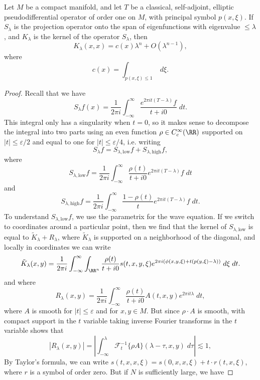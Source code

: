 \begin{theorem}
    Let $M$ be a compact manifold, and let $T$ be a classical, self-adjoint, elliptic pseudodifferential operator of order one on $M$, with principal symbol $p(x,\xi)$. If $S_\lambda$ is the projection operator onto the span of eigenfunctions with eigenvalue $\leq \lambda$, and $K_\lambda$ is the kernel of the operator $S_\lambda$, then
    \[ K_\lambda(x,x) = c(x) \lambda^n + O(\lambda^{n-1}), \]
    where
    \[  c(x) = \int_{p(x,\xi) \leq 1}\; d\xi. \]
\end{theorem}
\begin{proof}
    Recall that we have
    \[ S_\lambda f(x) = \frac{1}{2 \pi i} \int_{-\infty}^\infty \frac{e^{2 \pi i t (T - \lambda)} f}{t + i 0}\; dt. \]
    This integral only has a singularity when $t = 0$, so it makes sense to decompose the integral into two parts using an even function $\rho \in C_c^\infty(\RR)$ supported on $|t| \leq \varepsilon / 2$ and equal to one for $|t| \leq \varepsilon / 4$, i.e. writing
    \[ S_\lambda f = S_{\lambda, \text{low}} f + S_{\lambda,\text{high}} f, \]
    where
    \[ S_{\lambda, \text{low}} f = \frac{1}{2 \pi i} \int_{-\infty}^\infty \frac{\rho(t)}{t + i0} e^{2 \pi i t (T - \lambda)} f\; dt \]
    and
    \[ S_{\lambda,\text{high}} f = \frac{1}{2 \pi i} \int_{-\infty}^\infty \frac{1 - \rho(t)}{t} e^{2 \pi i t (T - \lambda)} f\; dt. \]
    To understand $S_{\lambda, \text{low}} f$, we use the parametrix for the wave equation. If we switch to coordinates around a particular point, then we find that the kernel of $S_{\lambda, \text{low}}$ is equal to $\tilde{K}_\lambda + R_\lambda$, where $\tilde{K}_\lambda$ is supported on a neighborhood of the diagonal, and locally in coordinates we can write
    \[ \tilde{K}_\lambda(x,y) = \frac{1}{2 \pi i} \int_{-\infty}^\infty \int_{\RR^n} \frac{\rho(t)}{t + i0} s(t,x,y,\xi) e^{2 \pi i (\phi(x,y,\xi) + t(p(y,\xi) - \lambda))}\; d\xi\; dt. \]
    and where
    \[ R_\lambda(x,y) = \frac{1}{2 \pi i} \int_{-\infty}^\infty \frac{\rho(t)}{t + i 0} A(t,x,y) e^{2 \pi i t \lambda}\; dt, \]
    where $A$ is smooth for $|t| \leq \varepsilon$ and for $x,y \in M$. But since $\rho \cdot A$ is smooth, with compact support in the $t$ variable taking inverse Fourier transforms in the $t$ variable shows that
    \[ |R_\lambda(x,y)| = \left| \int_{-\infty}^\lambda \mathcal{F}_t^{-1}\{\rho A\}(\lambda - \tau,x,y)\; d\tau \right| \lesssim 1, \]
    By Taylor's formula, we can write $s(t,x,x,\xi) = s(0,x,x,\xi) + t \cdot r(t,x,\xi)$, where $r$ is a symbol of order zero. But if $N$ is sufficiently large, we have

\end{proof}
